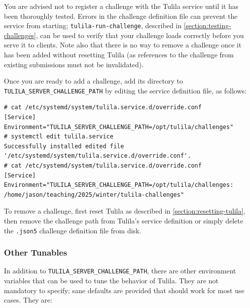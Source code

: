 \documentclass[12pt]{article}
\begin{document}
You are advised not to register a challenge with the Tulila service until it has been thoroughly tested. Errors in the challenge definition file can prevent the service from starting; \texttt{tulila-run-challenge}, described in \cref{section:testing-challenges}, can be used to verify that your challenge loads correctly before you serve it to clients. Note also that there is no way to remove a challenge once it has been added without resetting Tulila (as references to the challenge from existing submissions must not be invalidated).

Once you are ready to add a challenge, add its directory to \texttt{TULILA\_SERVER\_CHALLENGE\_PATH} by editing the service definition file, as follows:

\begin{Verbatim}
# cat /etc/systemd/system/tulila.service.d/override.conf
[Service]
Environment="TULILA_SERVER_CHALLENGE_PATH=/opt/tulila/challenges"
# systemctl edit tulila.service
Successfully installed edited file '/etc/systemd/system/tulila.service.d/override.conf'.
# cat /etc/systemd/system/tulila.service.d/override.conf
[Service]
Environment="TULILA_SERVER_CHALLENGE_PATH=/opt/tulila/challenges: /home/jason/teaching/2025/winter/tulila-challenges"
\end{Verbatim}

To remove a challenge, first reset Tulila as described in \cref{section:resetting-tulila}, then remove the challenge path from Tulila's service definition or simply delete the \texttt{.json5} challenge definition file from disk.

\subsubsection{Other Tunables}

In addition to \texttt{TULILA\_SERVER\_CHALLENGE\_PATH}, there are other environment variables that can be used to tune the behavior of Tulila. They are not mandatory to specify; sane defaults are provided that should work for most use cases. They are:
\end{document}
